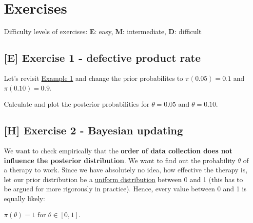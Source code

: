 \documentclass[
]{book}
\begin{document}
\section{Exercises}\label{exercises-2}

Difficulty levels of exercises:
\textbf{E}: easy,
\textbf{M}: intermediate,
\textbf{D}: difficult

\subsection{{[}E{]} Exercise 1 - defective product rate}\label{exercise_defective_product_rate}

Let's revisit \hyperref[example_defective_products]{Example 1} and change the prior probabilites to
\(\pi(0.05) = 0.1\) and \(\pi(0.10) = 0.9\).

Calculate and plot the posterior probabilities for \(\theta = 0.05\) and \(\theta = 0.10\).

\subsection{{[}H{]} Exercise 2 - Bayesian updating}\label{h-exercise-2---bayesian-updating}

We want to check empirically that the \textbf{order of data collection does not influence the posterior distribution}.
We want to find out the probability \(\theta\) of a therapy to work.
Since we have absolutely no idea, how effective the therapy is, let our prior distribution be a \href{https://en.wikipedia.org/wiki/Continuous_uniform_distribution}{uniform
distribution} between 0 and 1
(this has to be argued for more rigorously in practice). Hence,
every value between 0 and 1 is equally likely:

\(\pi(\theta) = 1\) for \(\theta \in [0,1]\).
\end{document}
